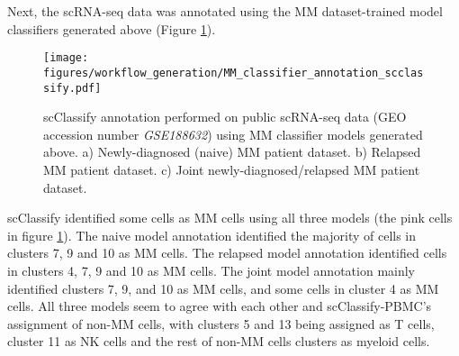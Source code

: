 Next, the scRNA-seq data was annotated using the MM dataset-trained model classifiers generated above (Figure \ref{fig:mm_classifier_scclassify_annotate}).
%
\begin{figure}[htb]
\centering
\texttt{[image: figures/workflow\_generation/MM\_classifier\_annotation\_scclassify.pdf]}
\caption[Public scRNA-seq data MM classifier annotation]{scClassify annotation performed on public scRNA-seq data (GEO accession number \textit{GSE188632}) using MM classifier models generated above.
a) Newly-diagnosed (naive) MM patient dataset.
b) Relapsed MM patient dataset.
c) Joint newly-diagnosed/relapsed MM patient dataset.
}
\label{fig:mm_classifier_scclassify_annotate}
\end{figure}
%
%
scClassify identified some cells as MM cells using all three models (the pink cells in figure \ref{fig:mm_classifier_scclassify_annotate}).
The naive model annotation identified the majority of cells in clusters 7, 9 and 10 as MM cells.
The relapsed model annotation identified cells in clusters 4, 7, 9 and 10 as MM cells.
The joint model annotation mainly identified clusters 7, 9, and 10 as MM cells, and some cells in cluster 4 as MM cells.
All three models seem to agree with each other and scClassify-PBMC's assignment of non-MM cells, with clusters 5 and 13 being assigned as T cells, cluster 11 as NK cells and the rest of non-MM cells clusters as myeloid cells.

